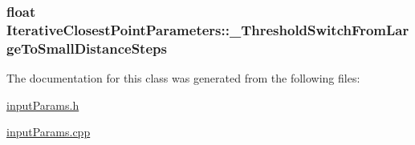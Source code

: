 \hypertarget{classIterativeClosestPointParameters_a65c322e9bacd48481fb2bb9b49501893}{
\subsubsection[{\-\_\-\-Threshold\-Switch\-From\-Large\-To\-Small\-Distance\-Steps}]{\setlength{\rightskip}{0pt plus 5cm}float Iterative\-Closest\-Point\-Parameters\-::\-\_\-\-Threshold\-Switch\-From\-Large\-To\-Small\-Distance\-Steps\hspace{0.3cm}{\ttfamily [private]}}}\label{classIterativeClosestPointParameters_a65c322e9bacd48481fb2bb9b49501893}


The documentation for this class was generated from the following files\-:\begin{DoxyCompactItemize}
\item 
\hyperlink{inputParams_8h}{input\-Params.\-h}\item 
\hyperlink{inputParams_8cpp}{input\-Params.\-cpp}\end{DoxyCompactItemize}
